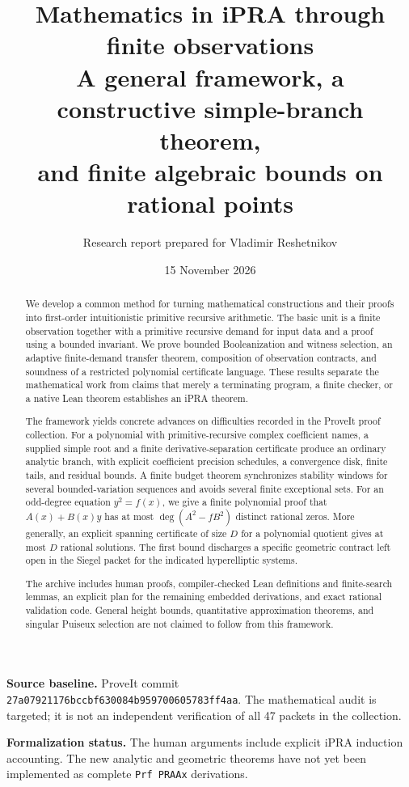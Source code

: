 \documentclass[11pt,oneside]{article}
\title{\textbf{Mathematics in iPRA through finite observations}\\[0.6em]
\large A general framework, a constructive simple-branch theorem,\\
and finite algebraic bounds on rational points}
\author{Research report prepared for Vladimir Reshetnikov}
\date{15 November 2026}
\theoremstyle{definition}
\theoremstyle{remark}
\begin{document}
\maketitle
\begin{abstract}
We develop a common method for turning mathematical constructions and their
proofs into first-order intuitionistic primitive recursive arithmetic. The
basic unit is a finite observation together with a primitive recursive demand
for input data and a proof using a bounded invariant. We prove bounded
Booleanization and witness selection, an adaptive finite-demand transfer
theorem, composition of observation contracts, and soundness of a restricted
polynomial certificate language. These results separate the mathematical
work from claims that merely a terminating program, a finite checker, or a
native Lean theorem establishes an iPRA theorem.

The framework yields concrete advances on difficulties recorded in the
ProveIt proof collection. For a polynomial with primitive-recursive complex
coefficient names, a supplied simple root and a finite derivative-separation
certificate produce an ordinary analytic branch, with explicit coefficient
precision schedules, a convergence disk, finite tails, and residual bounds.
A finite budget theorem synchronizes stability windows for several
bounded-variation sequences and avoids several finite exceptional sets.
For an odd-degree equation $y^2=f(x)$, we give a finite polynomial proof
that $A(x)+B(x)y$ has at most $\deg(A^2-fB^2)$ distinct rational zeros.
More generally, an explicit spanning certificate of size $D$ for a polynomial
quotient gives at most $D$ rational solutions. The first bound discharges a
specific geometric contract left open in the Siegel packet for the indicated
hyperelliptic systems.

The archive includes human proofs, compiler-checked Lean definitions and
finite-search lemmas, an explicit plan for the remaining embedded
derivations, and exact rational validation code. General height bounds,
quantitative approximation theorems, and singular Puiseux selection are
not claimed to follow from this framework.
\end{abstract}

\noindent\textbf{Source baseline.} ProveIt commit
\texttt{27a07921176bccbf630084b959700605783ff4aa}.
The mathematical audit is targeted; it is not an independent verification
of all 47 packets in the collection.\par
\noindent\textbf{Formalization status.} The human arguments include explicit
iPRA induction accounting. The new analytic and geometric theorems have
not yet been implemented as complete \texttt{Prf PRAAx} derivations.
\clearpage
\tableofcontents
\clearpage
\end{document}
